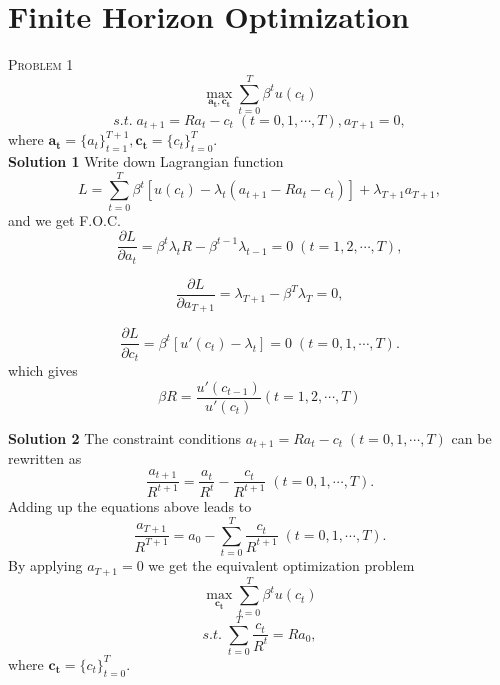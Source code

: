 \documentclass{article}
\begin{document}
\section{Finite Horizon Optimization}
\textsc{Problem 1}
$$
\max_{\mathbf{a_t},\mathbf{c_t}}\sum_{t=0}^T\beta^t u(c_t) 
$$
$$
s.t.\; a_{t+1}=Ra_t-c_t\;(t=0,1,\cdots ,T),a_{T+1}=0,
$$
where $\mathbf{a_t}=\{a_t\}_{t=1}^{T+1},\mathbf{c_t}=\{c_t\}_{t=0}^{T}$.\\ 


\noindent\textbf{Solution 1} 
Write down Lagrangian function 
$$
L=\sum_{t=0}^T\beta^t[u(c_t)-\lambda_t(a_{t+1}-Ra_t-c_t)]+\lambda_{T+1}a_{T+1}
,
$$
and we get F.O.C. 
$$
\frac{\partial L}{\partial a_t}=\beta^t\lambda_t R-\beta^{t-1}\lambda_{t-1}=0\;(t=1,2,\cdots ,T),
$$


$$
\frac{\partial L}{\partial a_{T+1}}=\lambda_{T+1}-\beta^{T}\lambda_{T}=0,
$$

$$
\frac{\partial L}{\partial c_t}=\beta^t[u'(c_t)-\lambda_t]=0\;(t=0,1,\cdots ,T).
$$
which gives
$$
\beta R=\frac{u'(c_{t-1})}{u'(c_t)}(t=1,2,\cdots ,T)
$$


\noindent\textbf{Solution 2}
The constraint conditions $a_{t+1}=Ra_t-c_t\;(t=0,1,\cdots ,T)$ can be rewritten as
\[
\frac{a_{t+1}}{R^{t+1}}=\frac{a_{t}}{R^{t}}-\frac{c_{t}}{R^{t+1}}\;(t=0,1,\cdots ,T).
\]
Adding up the equations above leads to
\[
\frac{a_{T+1}}{R^{T+1}}=a_{0}-\sum_{t=0}^T\frac{c_{t}}{R^{t+1}}\;(t=0,1,\cdots ,T).
\]
By applying $a_{T+1}=0$ we get the equivalent optimization problem
$$
\max_{\mathbf{c_t}}\sum_{t=0}^T\beta^t u(c_t)
$$
$$
s.t.\; \sum_{t=0}^{T}\frac{c_t}{R^t}=Ra_0,
$$
where $\mathbf{c_t}=\{c_t\}_{t=0}^{T}$.
~\\
\end{document}
